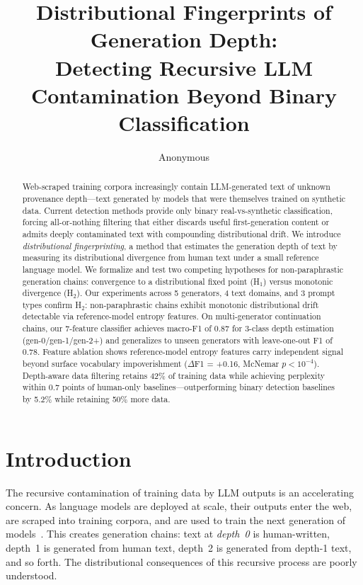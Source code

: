 \documentclass[letterpaper, 10pt]{article}
\title{Distributional Fingerprints of Generation Depth:\\Detecting Recursive LLM Contamination Beyond Binary Classification}
\author{Anonymous}
\begin{document}
\maketitle

\begin{abstract}
Web-scraped training corpora increasingly contain LLM-generated text of unknown provenance depth---text generated by models that were themselves trained on synthetic data.
Current detection methods provide only binary real-vs-synthetic classification, forcing all-or-nothing filtering that either discards useful first-generation content or admits deeply contaminated text with compounding distributional drift.
We introduce \emph{distributional fingerprinting}, a method that estimates the generation depth of text by measuring its distributional divergence from human text under a small reference language model.
We formalize and test two competing hypotheses for non-paraphrastic generation chains: convergence to a distributional fixed point (H$_1$) versus monotonic divergence (H$_2$).
Our experiments across 5 generators, 4 text domains, and 3 prompt types confirm H$_2$: non-paraphrastic chains exhibit monotonic distributional drift detectable via reference-model entropy features.
On multi-generator continuation chains, our 7-feature classifier achieves macro-F1 of 0.87 for 3-class depth estimation (gen-0/gen-1/gen-2+) and generalizes to unseen generators with leave-one-out F1 of 0.78.
Feature ablation shows reference-model entropy features carry independent signal beyond surface vocabulary impoverishment ($\Delta$F1 = +0.16, McNemar $p < 10^{-4}$).
Depth-aware data filtering retains 42\% of training data while achieving perplexity within 0.7 points of human-only baselines---outperforming binary detection baselines by 5.2\% while retaining 50\% more data.
\end{abstract}

\section{Introduction}

The recursive contamination of training data by LLM outputs is an accelerating concern.
As language models are deployed at scale, their outputs enter the web, are scraped into training corpora, and are used to train the next generation of models~\cite{shumailov2024model}.
This creates generation chains: text at \emph{depth~0} is human-written, depth~1 is generated from human text, depth~2 is generated from depth-1 text, and so forth.
The distributional consequences of this recursive process are poorly understood.
\end{document}
